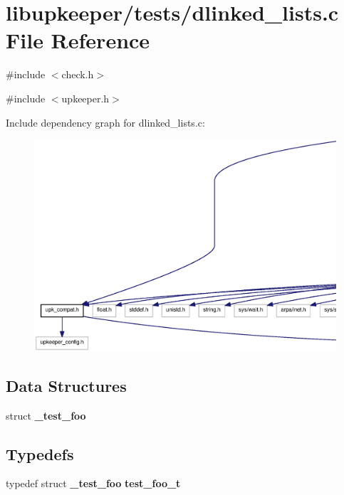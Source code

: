 \section{libupkeeper/tests/dlinked\_\-lists.c File Reference}
\label{dlinked__lists_8c}
{\ttfamily \#include $<$check.h$>$}\par
{\ttfamily \#include $<$upkeeper.h$>$}\par
Include dependency graph for dlinked\_\-lists.c:
\nopagebreak
\begin{figure}[H]
\begin{center}
\leavevmode
\includegraphics[width=400pt]{dlinked__lists_8c__incl}
\end{center}
\end{figure}
\subsection*{Data Structures}
\begin{DoxyCompactItemize}
\item 
struct {\bf \_\-test\_\-foo}
\end{DoxyCompactItemize}
\subsection*{Typedefs}
\begin{DoxyCompactItemize}
\item 
typedef struct {\bf \_\-test\_\-foo} {\bf test\_\-foo\_\-t}
\end{DoxyCompactItemize}
